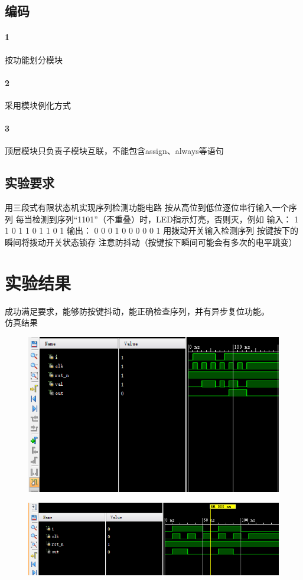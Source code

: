 \documentclass[UTF8]{ctexart}
\begin{document}
\subsection{编码}
\paragraph{1}按功能划分模块
\paragraph{2}采用模块例化方式
\paragraph{3}顶层模块只负责子模块互联，不能包含assign、always等语句
\subsection{实验要求}
用三段式有限状态机实现序列检测功能电路
按从高位到低位逐位串行输入一个序列
每当检测到序列“1101”（不重叠）时，LED指示灯亮，否则灭，例如
输入： 1 1 0 1 1 0 1 1 0 1 
输出： 0 0 0 1 0 0 0 0 0 1 
用拨动开关输入检测序列
按键按下的瞬间将拨动开关状态锁存
注意防抖动（按键按下瞬间可能会有多次的电平跳变）



\section{实验结果}
成功满足要求，能够防按键抖动，能正确检查序列，并有异步复位功能。\\
仿真结果
\begin{figure}[H]
  \centering
  \includegraphics[width=1\textwidth]{fsm.png}
\end{figure}
\begin{figure}[H]
  \centering
  \includegraphics[width=1\textwidth]{remove_glitch.png}
\end{figure}
\end{document}
